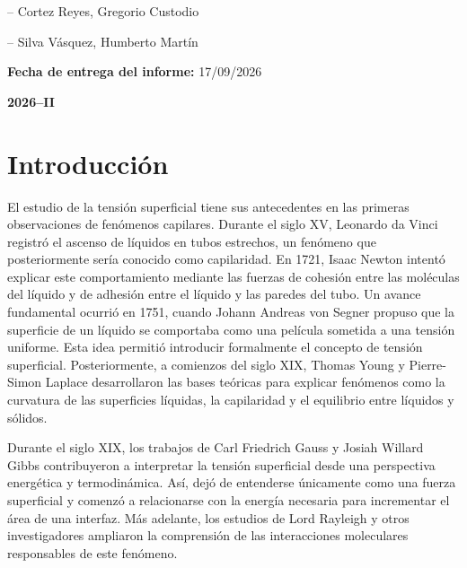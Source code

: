\documentclass[11pt,a4paper]{article}
\begin{document}
\begin{titlepage}
{-- Cortez Reyes, Gregorio Custodio
\vspace{0.20cm}
\hspace{0.6cm}

-- Silva Vásquez, Humberto Martín
}

\vspace{0.95cm}
{\large
\textbf{Fecha de entrega del informe:}
\hspace{0.40cm}
17/09/2026
}

\vspace{1.15cm}
\begin{center}
{\huge\bfseries
2026--II}

\end{center}

\end{titlepage}

\tableofcontents

\newpage
\pagestyle{fancy}

\section{Introducción}

El estudio de la tensión superficial tiene sus antecedentes
en las primeras observaciones de fenómenos capilares. Durante 
el siglo XV, Leonardo da Vinci registró el ascenso de líquidos 
en tubos estrechos, un fenómeno que posteriormente sería 
conocido como capilaridad. En 1721, Isaac Newton intentó explicar 
este comportamiento mediante las fuerzas de cohesión entre las 
moléculas del líquido y de adhesión entre el líquido y las paredes 
del tubo. 
Un avance fundamental ocurrió en 1751, cuando Johann Andreas 
von Segner propuso que la superficie de un líquido se comportaba 
como una película sometida a una tensión uniforme. Esta idea 
permitió introducir formalmente el concepto de tensión superficial. 
Posteriormente, a comienzos del siglo XIX, Thomas Young y Pierre-Simon 
Laplace desarrollaron las bases teóricas para explicar fenómenos como 
la curvatura de las superficies líquidas, la capilaridad y el equilibrio 
entre líquidos y sólidos. 


Durante el siglo XIX, los trabajos de Carl Friedrich Gauss y Josiah Willard 
Gibbs contribuyeron a interpretar la tensión superficial desde una 
perspectiva energética y termodinámica. Así, dejó de entenderse únicamente 
como una fuerza superficial y comenzó a relacionarse con la energía necesaria 
para incrementar el área de una interfaz. Más adelante, los estudios de Lord 
Rayleigh y otros investigadores ampliaron la comprensión de las interacciones 
moleculares responsables de este fenómeno. 
\end{document}

